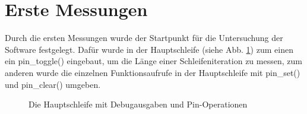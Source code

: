 \section{Erste Messungen}
Durch die ersten Messungen wurde der Startpunkt für die Untersuchung der Software
festgelegt. Dafür wurde in der Hauptschleife (siehe Abb. \ref{main_loop_full}) zum einen
ein pin\_toggle() eingebaut, um die Länge einer Schleifeniteration zu messen, zum anderen
wurde die einzelnen Funktionsaufrufe in der Hauptschleife mit pin\_set() und pin\_clear()
umgeben.
\begin{figure}[htb]
 \centering
 \caption{\label{main_loop_full}Die Hauptschleife mit Debugausgaben und Pin-Operationen}
\end{figure}
